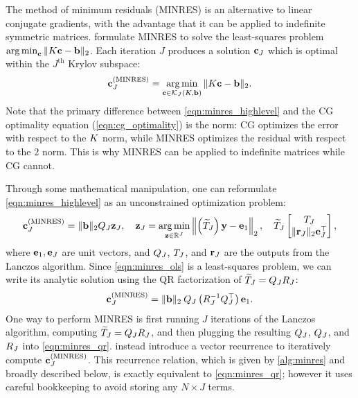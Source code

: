 The method of minimum residuals (MINRES) \cite{paige1975solution} is an alternative to linear conjugate gradients, with the advantage that it can be applied to indefinite symmetric matrices.
\citet{paige1975solution} formulate MINRES to solve the least-squares problem $\operatorname*{arg\,min}_{\mathbf{c}} \Vert K \mathbf{c} - \mathbf{b} \Vert_2$.
Each iteration $J$ produces a solution $\mathbf{c}_J$ which is optimal within the $J^\text{th}$ Krylov subspace:
%
\begin{equation}
	\mathbf{c}_J^{(\text{MINRES})} = \operatorname*{arg\,min}_{\mathbf{c} \in \mathcal{K}_J(K, \mathbf{b})} \Vert K \mathbf{c} - \mathbf{b} \Vert_2.
	\label{eqn:minres_highlevel}
\end{equation}
%
Note that the primary difference between \cref{eqn:minres_highlevel} and the CG optimality equation (\cref{eqn:cg_optimality}) is the norm:
CG optimizes the error with respect to the $K$ norm, while MINRES optimizes the residual with respect to the $2$ norm.
This is why MINRES can be applied to indefinite matrices while CG cannot.

Through some mathematical manipulation, one can reformulate \cref{eqn:minres_highlevel} as an unconstrained optimization problem:
%
\begin{align}
  \mathbf{c}_J^{(\text{MINRES})} = \Vert \mathbf{b} \Vert_2 Q_J \mathbf{z}_J,
  \quad
  \mathbf{z}_J = \operatorname*{arg\,min}_{\mathbf{z} \in \mathbb{R}^J} \left\Vert
		\left( \widetilde {T}_J \right)\mathbf{y} - \mathbf{e}_1
	\right\Vert_2,
	\quad
  \widetilde {T}_J \begin{bmatrix} T_J \\ \Vert \mathbf{r}_J \Vert_2 \mathbf{e}_J^\top  \end{bmatrix},
  \label{eqn:minres_ols}
\end{align}
%
where $\mathbf{e}_1, \mathbf{e}_J$ are unit vectors, and $Q_J$, $T_J$, and $\mathbf{r}_J$ are the outputs from the Lanczos algorithm.
Since \cref{eqn:minres_ols} is a least-squares problem, we can write its analytic solution using the QR factorization of $ \widetilde {T}_J = Q_J R_J$:
%
\begin{align}
  \mathbf{c}_J^{(\text{MINRES})} = \Vert \mathbf{b} \Vert_2 \: Q_J \left( R_J^{-1} Q_J^\top \right) \mathbf{e}_1.
	\label{eqn:minres_qr}
\end{align}
%
One way to perform MINRES is first running $J$ iterations of the Lanczos algorithm, computing $\widetilde {T}_J = Q_J R_J$, and then plugging the resulting $Q_J$, $Q_J$, and $R_J$ into \cref{eqn:minres_qr}.
\citeauthor{paige1975solution} instead introduce a vector recurrence to iteratively compute $\mathbf{c}_J^\text{(MINRES)}$.
This recurrence relation, which is given by \cref{alg:minres} and broadly described below, is exactly equivalent to \cref{eqn:minres_qr}; however it uses careful bookkeeping to avoid storing any $N \times J$ terms.

